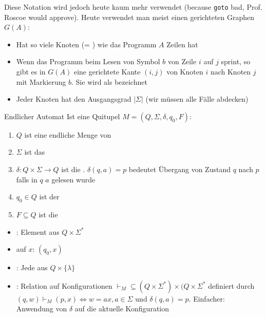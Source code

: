 Diese Notation wird jedoch heute kaum mehr verwendet (because \texttt{goto} bad, Prof. Roscoe would approve).
Heute verwendet man meist einen gerichteten Graphen $G(A)$:
\begin{itemize}
    \item Hat so viele Knoten (= ) wie das Programm $A$ Zeilen hat
    \item Wenn das Programm beim Lesen von Symbol $b$ von Zeile $i$ auf $j$ sprint, so gibt es in $G(A)$ eine gerichtete Kante $(i, j)$ von Knoten $i$ nach Knoten $j$ mit Markierung $b$. Sie wird als  bezeichnet
    \item Jeder Knoten hat den Ausgangsgrad $|\Sigma|$ (wir müssen alle Fälle abdecken)
\end{itemize}

\begin{definition}[]{Endlicher Automat}
    Ist eine Quitupel $M = (Q, \Sigma, \delta, q_0, F)$:
    \begin{enumerate}[label=\textit{(\roman*)}]
        \item $Q$ ist eine endliche Menge von 
        \item $\Sigma$ ist das 
        \item $\delta: Q \times \Sigma \rightarrow Q$ ist die . $\delta(q, a) = p$ bedeutet Übergang von Zustand $q$ nach $p$ falls in $q$ $a$ gelesen wurde
        \item $q_0 \in Q$ ist der 
        \item $F \subseteq Q$ ist die 
    \end{enumerate}
    \rmvspace
    \rmvspace
    \begin{multicols}{2}
        \begin{itemize}
            \item {}: Element aus $Q \times \Sigma^*$
            \item {} auf $x$: $(q_0, x)$
            \item {}: Jede aus $Q \times \{ \lambda \}$
        \end{itemize}
    \end{multicols}
    \rmvspace
    \rmvspace
    \begin{itemize}
        \item {}: Relation auf Konfigurationen $\vdash_M \subseteq (Q \times \Sigma^*) \times (Q \times \Sigma^*$ definiert durch $(q, w) \vdash_M (p, x) \Leftrightarrow w = ax, a \in \Sigma \text{ und } \delta(q, a) = p$. Einfacher: Anwendung von $\delta$ auf die aktuelle Konfiguration

\end{itemize}
\end{definition}
